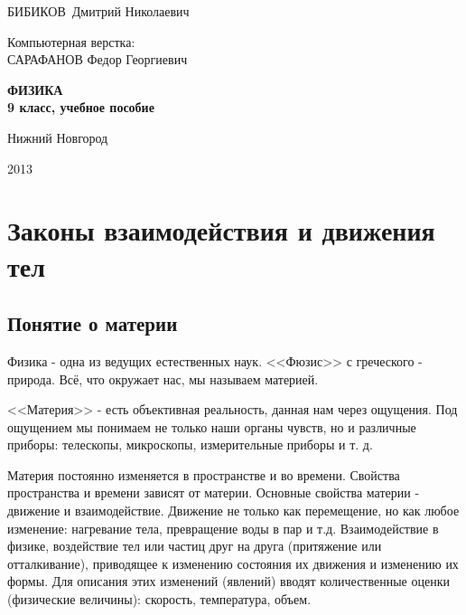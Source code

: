 \documentclass[a5paper, 10pt]{diss_4}
\renewcommand{\'}{\,'}
\begin{document}
\begin{titlepage}
\vspace*{1cm}
\begin{center}

 БИБИКОВ\ Дмитрий Николаевич
\vspace{1mm}

 Компьютерная верстка: \\
\vspace{2mm}
 САРАФАНОВ Федор Георгиевич
\vspace{3mm}

\end{center}

\vspace{2cm}

\begin{center}
 \bf
\Huge{  ФИЗИКА  }   \\
\large{ 9 класс, учебное пособие}
\end{center}

\vfill

\begin{center}
Нижний Новгород

2013
\end{center}
\end{titlepage}
\addtocounter{page}{1}
\tableofcontents
\chapter{Законы взаимодействия и движения тел}
\section{Понятие о материи}

 Физика - одна из ведущих естественных наук. <<Фюзис>> с греческого - природа.
Всё, что окружает нас, мы называем материей.

  <<Материя>> - есть объективная реальность, данная нам через ощущения. Под
ощущением мы понимаем не только наши органы чувств, но и различные приборы:
телескопы, микроскопы, измерительные приборы и т. д.

  Материя постоянно изменяется в пространстве и во времени. Свойства
пространства и времени зависят от материи. Основные свойства материи -
движение и взаимодействие. Движение не только как перемещение, но как любое
изменение: нагревание тела, превращение воды в пар и т.д. Взаимодействие в
физике, воздействие тел или частиц друг на друга (притяжение или
отталкивание), приводящее к изменению состояния их движения и изменению их
формы. Для описания этих изменений (явлений) вводят количественные оценки
(физические величины): скорость, температура, объем.
\end{document}

